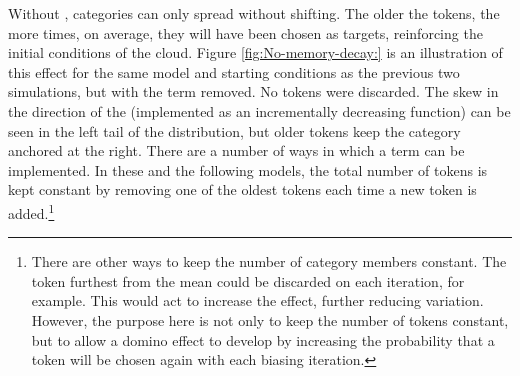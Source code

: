 Without , categories can only spread without shifting.
The older the tokens, the more times, on average, they will have been
chosen as  targets, reinforcing the initial conditions of
the cloud. Figure \ref{fig:No-memory-decay:} is an illustration of
this effect for the same model and starting conditions as the previous
two simulations, but with the  term removed. No tokens were
discarded. The skew in the direction of the   (implemented
as an incrementally decreasing function) can be seen in the left tail
of the distribution, but older tokens keep the category anchored at
the right. There are a number of ways in which a  term
can be implemented. In these and the following models, the total
number of tokens is kept constant by removing one of the oldest tokens
each time a new token is added.\footnote{There are other ways to keep the number of category members constant.
The token furthest from the mean could be discarded on each iteration,
for example. This would act to increase the  effect, further
reducing variation. However, the purpose here is not only to keep
the number of tokens constant, but to allow a domino effect to develop
by increasing the probability that a token will be chosen again with
each biasing iteration. }

